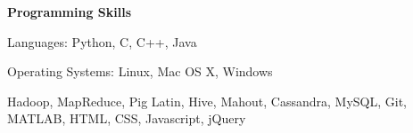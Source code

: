 \documentclass[letterpaper,11pt]{article}
\makeatletter
\newcommand{\resitem}[1]{\item[\ding{226}] #1 \vspace{-2pt}}
\newcommand{\resheading}[1]{{\large \colorbox{mygrey}{\begin{minipage}{\textwidth}{\textbf{#1 \vphantom{p\^{E}}}}\end{minipage}}}}
\newcommand{\ressubheading}[4]{
\begin{tabular*}{7.0in}{l@{\extracolsep{\fill}}r}
		\textbf{#1} & #2 \\
		\textit{#3} & \textit{#4} \\
\end{tabular*}\vspace{-6pt}}
\makeatother
\begin{document}
\begin{itemize}

%


\end{itemize}

\resheading{Programming Skills}
	\begin{description}
	\begin{multicols}{2}
		\item[Languages:]
			Python, C, C++, Java
		\item[Operating Systems:]
			Linux, Mac OS X, Windows
	\end{multicols}
	\vspace{-20pt}
		\item[Miscellaneous:]
			Hadoop, MapReduce, Pig Latin, Hive, Mahout, Cassandra, MySQL, Git, MATLAB, HTML, CSS, Javascript, jQuery 
	\end{description}
\end{document}
